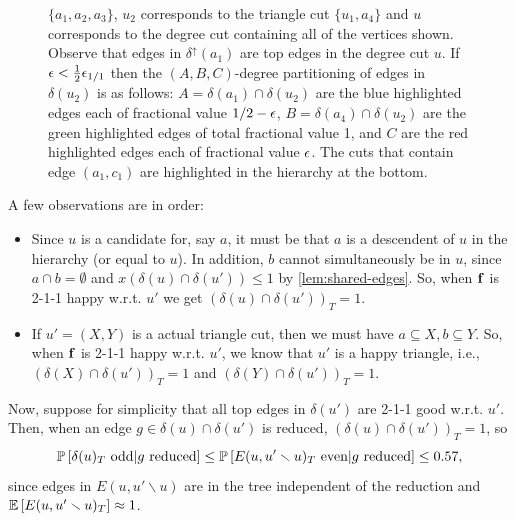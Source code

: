 \begin{figure}[htb]
{$\{a_1,a_2,a_3\}$, $u_2$ corresponds to the triangle cut $\{u_1,a_4\}$ and $u$ corresponds to the degree cut containing all of the vertices shown. Observe that edges in $\delta^\uparrow(a_1)$ are top edges in the degree cut $u$. 
If $\eps<\frac12 \eps_{1/1}$ then the $(A,B,C)$-degree partitioning
of edges in $\delta(u_2)$ is as follows: 
$A=\delta(a_1)\cap\delta(u_2)$ are the blue highlighted edges each of fractional value $1/2-\eps$, $B=\delta(a_4)\cap\delta(u_2)$ are the green highlighted edges of total fractional value 1, and $C$ are the red highlighted edges each of fractional value $\eps$. The cuts that contain edge $(a_1,c_1)$ are highlighted in the  hierarchy at the bottom.
}
\label{fig:topedgeABCmotivation}
\end{figure}

A few observations are  in order:
\begin{itemize}
\item Since $u$ is a candidate for, say $a$, it must be that $a$ is a descendent of $u$  in the hierarchy (or equal to $u$). In addition, $b$ cannot simultaneously be in $u$, since $a\cap b=\emptyset$ and $x(\delta(u) \cap\delta(u')) \le 1$ by \cref{lem:shared-edges}.  So, when $\bbf$ is 2-1-1 happy w.r.t.   $u'$ we get $(\delta(u)\cap\delta(u'))_T=1$.
\item If $u'=(X,Y)$ is a actual triangle cut, then we must have $a\subseteq X, b\subseteq Y$. So, when $\bbf$ is 2-1-1 happy w.r.t. $u'$, we know that $u'$ is a happy triangle, i.e., $(\delta(X)\cap\delta(u'))_T=1$ and $(\delta(Y)\cap\delta(u'))_T=1$.
\end{itemize}

Now, suppose for simplicity that all top edges in $\delta(u')$ are 2-1-1 good w.r.t. $u'$. Then, when an edge $g\in\delta(u)\cap\delta(u')$ is reduced, $(\delta(u)\cap\delta(u'))_T=1$, so 
$$ \P{\delta(u)_T\text{ odd} | g\text{ reduced}} \leq \P{E(u,u'\smallsetminus u)_T\text{ even}| g\text{ reduced}}\leq 0.57,$$
since edges in $E(u,u'\smallsetminus u)$ are in the tree independent of the reduction and $\E{E(u,u'\smallsetminus u)_T}\approx 1$.






